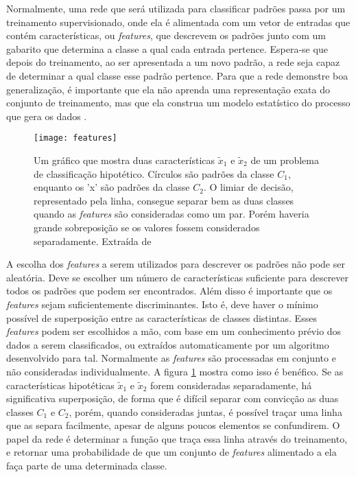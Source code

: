 Normalmente, uma rede que será utilizada para classificar padrões passa por um treinamento supervisionado, onde ela é alimentada com um vetor de entradas que contém características, ou \textit{features}, que descrevem os padrões junto com um gabarito que determina a classe a qual cada entrada pertence. Espera-se que depois do treinamento, ao ser apresentada a um novo padrão, a rede seja capaz de determinar a qual classe esse padrão pertence. Para que a rede demonstre boa generalização, é importante que ela não aprenda uma representação exata do conjunto de treinamento, mas que ela construa um modelo estatístico do processo que gera os dados \cite{NNForPR}.

\begin{figure}[!ht]
\centering
\texttt{[image: features]}
\label{fig:features}
\caption{Um gráfico que mostra duas características $\tilde{x}_1$ e $\tilde{x}_2$ de um problema de classificação hipotético. Círculos são padrões da classe $C_1$, enquanto os 'x' são padrões da classe $C_2$. O limiar de decisão, representado pela linha, consegue separar bem as duas classes quando as \textit{features} são consideradas como um par. Porém haveria grande sobreposição se os valores fossem considerados separadamente. Extraída de \cite{NNForPR}}
\end{figure}

A escolha dos \textit{features} a serem utilizados para descrever os padrões não pode ser aleatória. Deve se escolher um número de características suficiente para descrever todos os padrões que podem ser encontrados. Além disso é importante que os \textit{features} sejam suficientemente discriminantes. Isto é, deve haver o mínimo possível de superposição entre as características de classes distintas. Esses \textit{features} podem ser escolhidos a mão, com base em um conhecimento prévio dos dados a serem classificados, ou extraídos automaticamente por um algoritmo desenvolvido para tal. Normalmente as \textit{features} são processadas em conjunto e não consideradas individualmente. A figura \ref{fig:features} mostra como isso é benéfico. Se as características hipotéticas $\tilde{x}_1$ e $\tilde{x}_2$ forem consideradas separadamente, há significativa superposição, de forma que é difícil separar com convicção as duas classes $C_1$ e $C_2$, porém, quando consideradas juntas, é possível traçar uma linha que as separa facilmente, apesar de alguns poucos elementos se confundirem. O papel da rede é determinar a função que traça essa linha através do treinamento, e retornar uma probabilidade de que um conjunto de \textit{features} alimentado a ela faça parte de uma determinada classe.



